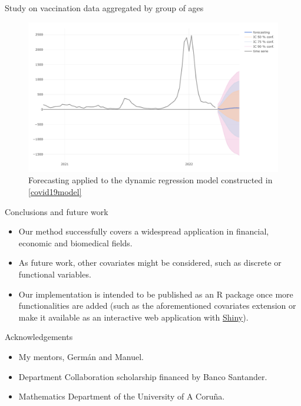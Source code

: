 \documentclass[10pt]{beamer}
\begin{document}
\begin{frame}{Study on vaccination data aggregated by group of ages}


    \begin{figure}\small
        \caption{Forecasting applied to the dynamic regression model constructed in \ref*{covid19model}}
        \includegraphics[scale=0.4]{gallery/covid19-forecasting.pdf}
    \end{figure}
\end{frame}


\begin{frame}{Conclusions and future work}
    \begin{itemize}
        \item Our method successfully covers a widespread application in financial, economic and biomedical fields.
        \item As future work, other covariates might be considered, such as discrete or functional variables.
        \item Our implementation is intended to be published as an R package once more functionalities are added (such as the aforementioned covariates extension or make it available as an interactive web application with \href{https://shiny.rstudio.com/}{Shiny}). 
    \end{itemize}
    \begin{block}{Acknowledgements}
        \begin{itemize}
            \item My mentors, Germán and Manuel.
            \item Department Collaboration scholarship financed by Banco Santander.
            \item Mathematics Department of the University of A Coruña.
        \end{itemize}
    \end{block}
    
\end{frame}


\begin{frame}
    
    
\end{frame}
\end{document}
